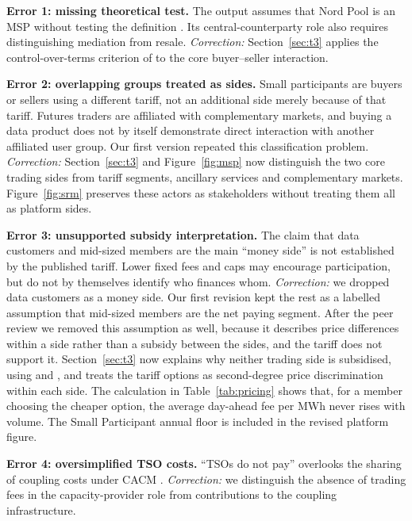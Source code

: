 \textbf{Error 1: missing theoretical test.}
The output assumes that Nord Pool is an MSP without
testing the definition
\citep[Def.~10.1]{OverbyAudestad2021}.
Its central-counterparty role also requires distinguishing
mediation from resale.
\emph{Correction:} Section~\ref{sec:t3}
applies the control-over-terms criterion of
\citet{HagiuWright2015}
to the core buyer--seller interaction.

\textbf{Error 2: overlapping groups treated as sides.}
Small participants are buyers or sellers using a different
tariff, not an additional side merely because of that tariff.
Futures traders are affiliated with complementary markets,
and buying a data product does not by itself demonstrate
direct interaction with another affiliated user group.
Our first version repeated this classification problem.
\emph{Correction:} Section~\ref{sec:t3}
and Figure~\ref{fig:msp} now distinguish the two core
trading sides from tariff segments, ancillary services
and complementary markets.
Figure~\ref{fig:srm} preserves these actors as stakeholders
without treating them all as platform sides.

\textbf{Error 3: unsupported subsidy interpretation.}
The claim that data customers and mid-sized members
are the main ``money side'' is not established
by the published tariff.
Lower fixed fees and caps may encourage participation,
but do not by themselves identify who finances whom.
\emph{Correction:} we dropped data customers as a money
side. Our first revision kept the rest as a labelled
assumption that mid-sized members are the net paying segment.
After the peer review we removed this assumption as well,
because it describes price differences within a side
rather than a subsidy between the sides,
and the tariff does not support it.
Section~\ref{sec:t3} now explains why neither trading side
is subsidised, using \citet{RochetTirole2003}
and \citet{Armstrong2006}, and treats the tariff options
as second-degree price discrimination within each side.
The calculation in Table~\ref{tab:pricing} shows that,
for a member choosing the cheaper option, the average
day-ahead fee per MWh never rises with volume.
The Small Participant annual floor is included
in the revised platform figure.

\textbf{Error 4: oversimplified TSO costs.}
``TSOs do not pay'' overlooks the sharing of coupling
costs under CACM \citep[Articles~76 and~80]{CACM2015}.
\emph{Correction:} we distinguish the absence of trading
fees in the capacity-provider role from contributions
to the coupling infrastructure.

